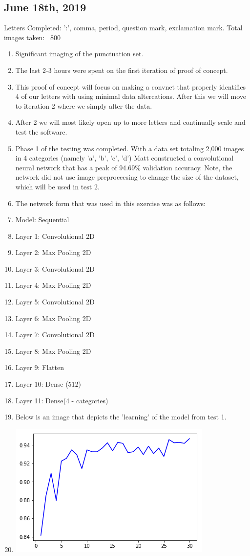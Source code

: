 \documentclass[12pt]{article} %
\begin{document}
\subsection{June 18th, 2019}
Letters Completed: ':', comma, period, question mark, exclamation mark.\newline
Total images taken: ~800 \newline
\noindent\makebox[\linewidth]{\rule{15cm}{0.4pt}}
\begin{enumerate}[label = (\roman*)]
\item Significant imaging of the punctuation set.
\item The last 2-3 hours were spent on the first iteration of proof of concept.
\item This proof of concept will focus on making a convnet that properly identifies 4 of our letters with using minimal data altercations. After this we will move to iteration 2 where we simply alter the data. 
\item After 2 we will most likely open up to more letters and continually scale and test the software.
\item Phase 1 of the testing was completed. With a data set totaling 2,000 images in 4 categories (namely 'a', 'b', 'c', 'd') Matt constructed a convolutional
neural network that has a peak of 94.69\% validation accuracy. Note, the network did not use image preproccesing to change the size of the dataset, which will be used in test 2.
\item The network form that was used in this exercise was as follows:
\item Model: Sequential
\item Layer 1: Convolutional 2D
\item Layer 2: Max Pooling 2D
\item Layer 3: Convolutional 2D
\item Layer 4: Max Pooling 2D
\item Layer 5: Convolutional 2D
\item Layer 6: Max Pooling 2D
\item Layer 7: Convolutional 2D
\item Layer 8: Max Pooling 2D
\item Layer 9: Flatten
\item Layer 10: Dense (512)
\item Layer 11: Dense(4 - categories)
\item Below is an image that depicts the 'learning' of the model from test 1.
\item \includegraphics{convnet-test-1-val-acc}
\end{enumerate}
\end{document}
